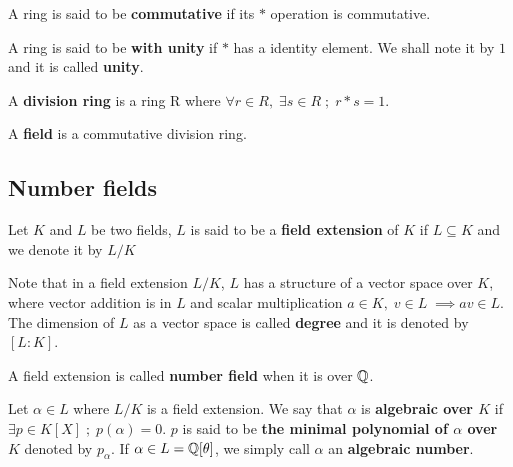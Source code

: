\documentclass[a4paper,12pt]{article}
\begin{document}
\begin{definition}
  A ring is said to be \textbf{commutative} if its $*$ operation is commutative.
\end{definition}

\begin{definition}
  A ring is said to be \textbf{with unity} if $*$ has a identity element. We
  shall note it by $1$ and it is called \textbf{unity}.

\end{definition}

\begin{definition}
  A \textbf{division ring} is a ring R where $\forall r \in R, \; \exists s \in R \; ; \; r*s = 1$.
\end{definition}

\begin{definition}
  A \textbf{field} is a commutative division ring.
\end{definition}

\subsection{Number  fields}
\label{sec:orgf7c7547}

   \begin{definition}
  Let $K$ and $L$ be two fields, $L$ is said to be a \textbf{field extension} of
  $K$ if $L \subseteq K$ and we denote it by $L/K$
\end{definition}

Note that in a field extension \(L/K\), \(L\) has a structure of a vector space over
\(K\), where vector addition is in \(L\) and scalar multiplication \(a \in K, \; v \in L
   \; \implies av \in L\). The dimension of \(L\) as a vector space is called
\textbf{degree} and it is denoted by \([L:K]\).

\begin{definition}
  A field extension is called \textbf{number field} when it is over $\mathbb{Q}$.
\end{definition}

\begin{definition}
  Let $\alpha \in L$ where $L/K$ is a field extension. We say that $\alpha$ is
  \textbf{algebraic over $K$} if $\exists p \in K[X] \;;\; p(\alpha) = 0$. $p$ is said to be
  \textbf{the minimal polynomial of $\alpha$ over $K$} denoted by $p_\alpha$. If $\alpha \in L =
  \mathbb{Q}[\theta]$, we simply call $\alpha$ an \textbf{algebraic number}.
\end{definition}
\end{document}
